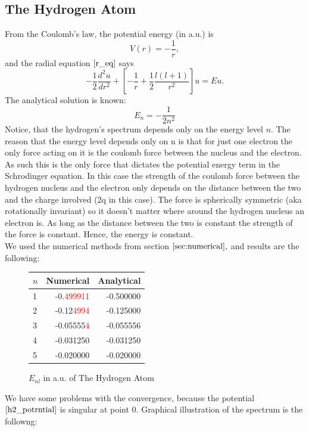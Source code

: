 \documentclass[a4paper, 12pt]{article}
\begin{document}
\subsection{The Hydrogen Atom}
From the Coulomb's law, the potential energy (in a.u.) is 
\begin{equation}\label{h2_potrntial}
	V(r) = -\frac{1}{r},
\end{equation}
and the radial equation $\eqref{r_eq}$  says
$$-\frac{1}{2}\frac{d^2 u}{dr^2}+[-\frac{1}{r}+\frac{1}{2}\frac{l(l+1)}{r^2}]u = Eu.$$
The analytical solution is known:
\begin{equation}\label{h2_sol}
   E_n = -\frac{1}{2 n^2}
\end{equation}
Notice, that the hydrogen's spectrum depends only on the energy level $n.$ The reason that the energy level depends only on n is that for just one electron the only force acting on it is the coulomb force between the nucleus and the electron. As such this is the only force that dictates the potential energy term in the Schrodinger equation. In this case the strength of the coulomb force between the hydrogen nucleus and the electron only depends on the distance between the two and the charge involved (2q in this case). The force is spherically symmetric (aka rotationally invariant) so it doesn't matter where around the hydrogen nucleus an electron is. As long as the distance between the two is constant the strength of the force is constant. Hence, the energy is constant.\\
We used the numerical methods from section $\ref{sec:numerical},$ and results are the following:
\begin{figure}[h!]
\centering
\begin{tabular}{lrr}
\toprule
\centering
$n$ &         Numerical &         Analytical \\
\midrule
1 & -0.\textcolor{red}{499911} & -0.500000 \\
2 & -0.12\textcolor{red}{4994} & -0.125000 \\
3 & -0.05555\textcolor{red}{4} & -0.055556 \\
4 & -0.031250 & -0.031250 \\
5 & -0.020000 & -0.020000 \\
\bottomrule
\end{tabular}
\caption{$E_{nl}$ in a.u. of The Hydrogen Atom}
\end{figure}
We have some problems with the convergence, because the potential $\eqref{h2_potrntial}$ is singular at point 0. Graphical illustration of the spectrum is the followng:
\end{document}
